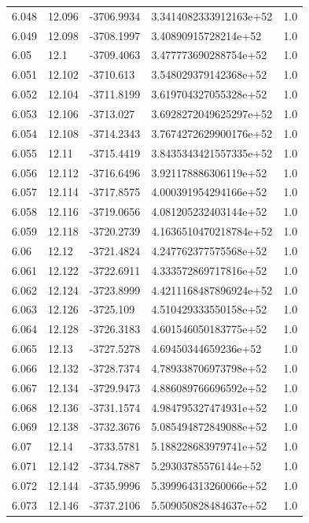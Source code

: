 \begin{tabular}{lllll}
6.048 & 12.096 & -3706.9934 & 3.3414082333912163e+52 & 1.0 \\
6.049 & 12.098 & -3708.1997 & 3.40890915728214e+52 & 1.0 \\
6.05 & 12.1 & -3709.4063 & 3.477773690288754e+52 & 1.0 \\
6.051 & 12.102 & -3710.613 & 3.548029379142368e+52 & 1.0 \\
6.052 & 12.104 & -3711.8199 & 3.619704327055328e+52 & 1.0 \\
6.053 & 12.106 & -3713.027 & 3.6928272049625297e+52 & 1.0 \\
6.054 & 12.108 & -3714.2343 & 3.7674272629900176e+52 & 1.0 \\
6.055 & 12.11 & -3715.4419 & 3.8435343421557335e+52 & 1.0 \\
6.056 & 12.112 & -3716.6496 & 3.921178886306119e+52 & 1.0 \\
6.057 & 12.114 & -3717.8575 & 4.000391954294166e+52 & 1.0 \\
6.058 & 12.116 & -3719.0656 & 4.081205232403144e+52 & 1.0 \\
6.059 & 12.118 & -3720.2739 & 4.1636510470218784e+52 & 1.0 \\
6.06 & 12.12 & -3721.4824 & 4.247762377575568e+52 & 1.0 \\
6.061 & 12.122 & -3722.6911 & 4.333572869717816e+52 & 1.0 \\
6.062 & 12.124 & -3723.8999 & 4.4211168487896924e+52 & 1.0 \\
6.063 & 12.126 & -3725.109 & 4.510429333550158e+52 & 1.0 \\
6.064 & 12.128 & -3726.3183 & 4.601546050183775e+52 & 1.0 \\
6.065 & 12.13 & -3727.5278 & 4.69450344659236e+52 & 1.0 \\
6.066 & 12.132 & -3728.7374 & 4.789338706973798e+52 & 1.0 \\
6.067 & 12.134 & -3729.9473 & 4.886089766696592e+52 & 1.0 \\
6.068 & 12.136 & -3731.1574 & 4.984795327474931e+52 & 1.0 \\
6.069 & 12.138 & -3732.3676 & 5.085494872849088e+52 & 1.0 \\
6.07 & 12.14 & -3733.5781 & 5.188228683979741e+52 & 1.0 \\
6.071 & 12.142 & -3734.7887 & 5.29303785576144e+52 & 1.0 \\
6.072 & 12.144 & -3735.9996 & 5.399964313260066e+52 & 1.0 \\
6.073 & 12.146 & -3737.2106 & 5.509050828484637e+52 & 1.0 \\

\end{tabular}
